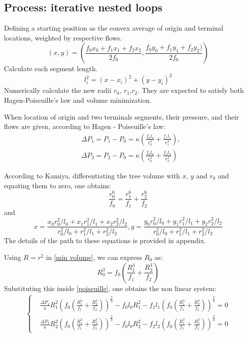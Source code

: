 \documentclass[a4paper, 11pt]{article} %
\begin{document}
\subsection*{Process: iterative nested loops}

Defining a starting position as the convex average of origin and terminal locations, weighted by respective flows.
\begin{equation}
(x,y) = (\frac{f_0x_0 + f_1x_1 + f_2x_2}{2f_0},\frac{f_0y_0 + f_1y_1 + f_2y_2 )}{2f_0})
\end{equation}
Calculate each segment length.
\begin{equation}
l_i^2 = (x - x_i)^2 + (y - y_i)^2
\label{length}
\end{equation}
Numerically calculate the new radii $r_0$, $r_1$,$r_2$. They are expected to satisfy both Hagen-Poiseuille's law and volume minimization.

When location of origin and two terminals segments, their pressure, and their flows are given, according to Hagen - Poiseuille's law:
\begin{align}
&\Delta P_1 = P_1 - P_0 = \kappa(\frac{f_0l_0}{r_0^4} + \frac{f_1l_1}{r_1^4}), \\
&\Delta P_2 = P_2 - P_0 = \kappa(\frac{f_0l_0}{r_0^4} + \frac{f_2l_2}{r_2^4})
\label{poiseuille}
\end{align}
  
According to  Kamiya, differentiating the tree volume with $x$, $y$ and $r_0$ and equating them to zero, one obtains:
\begin{equation}
\frac{r_0^6}{f_0} = \frac{r_1^6}{f_1} + \frac{r_2^6}{f_2}
\label{min volume}
\end{equation}
and 
\begin{equation}
x = \frac{x_0 r_0^2/l_0 + x_1 r_1^2/l_1 + x_2 r_2^2/l_2}{r_0^2/l_0 + r_1^2/l_1 + r_2^2 / l_2},
y = \frac{y_0 r_0^2/l_0 + y_1 r_1^2/l_1 + y_2 r_2^2/l_2}{r_0^2/l_0 + r_1^2/l_1 + r_2^2 / l_2}
\label{position}
\end{equation}
The details of the path to these equations is provided in appendix.

Using $R = r^2$ in \eqref{min volume}, we can express $R_0$ as:
\begin{equation}
R_0^3 = f_0(\frac{R_1^3}{f_1} + \frac{R_2^3}{f_2})
\end{equation} 
Substituting this inside \eqref{poiseuille}, one obtains the non linear system:
\begin{align}
\begin{cases}
&\frac{\Delta P_1}{\kappa}R_1^2 \left(f_0(\frac{R_1^3}{f_1} + \frac{R_2^3}{f_2}) \right)^\frac{2}{3} -f_0l_0R_1^2 - f_1l_1\left(f_0(\frac{R_1^3}{f_1} + \frac{R_2^3}{f_2}) \right)^\frac{2}{3} = 0 \\
&\frac{\Delta P_2}{\kappa}R_2^2 \left(f_0(\frac{R_1^3}{f_1} + \frac{R_2^3}{f_2}) \right)^\frac{2}{3} -f_0l_0R_2^2 - f_2l_2\left(f_0(\frac{R_1^3}{f_1} + \frac{R_2^3}{f_2}) \right)^\frac{2}{3} = 0
\end{cases}
\label{non linear system}
\end{align}
\end{document}
